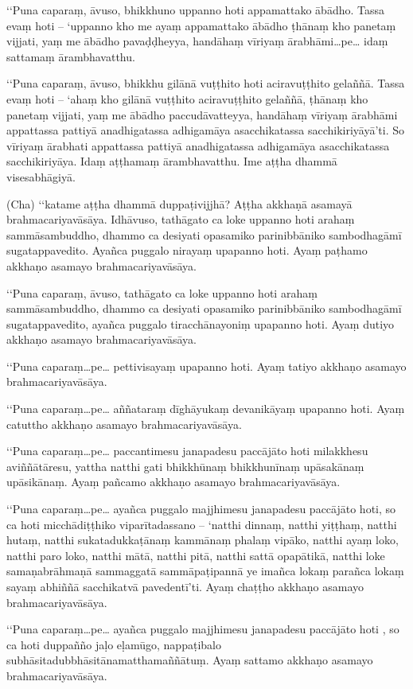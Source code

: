 ‘‘Puna caparaṃ, āvuso, bhikkhuno uppanno hoti appamattako ābādho. Tassa evaṃ hoti – ‘uppanno kho me ayaṃ appamattako ābādho ṭhānaṃ kho panetaṃ vijjati, yaṃ me ābādho pavaḍḍheyya, handāhaṃ vīriyaṃ ārabhāmi…pe… idaṃ sattamaṃ ārambhavatthu.

‘‘Puna caparaṃ, āvuso, bhikkhu gilānā vuṭṭhito hoti aciravuṭṭhito gelaññā. Tassa evaṃ hoti – ‘ahaṃ kho gilānā vuṭṭhito aciravuṭṭhito gelaññā, ṭhānaṃ kho panetaṃ vijjati, yaṃ me ābādho paccudāvatteyya, handāhaṃ vīriyaṃ ārabhāmi appattassa pattiyā anadhigatassa adhigamāya asacchikatassa sacchikiriyāyā’ti. So vīriyaṃ ārabhati appattassa pattiyā anadhigatassa adhigamāya asacchikatassa sacchikiriyāya. Idaṃ aṭṭhamaṃ ārambhavatthu. Ime aṭṭha dhammā visesabhāgiyā.

(Cha) ‘‘katame aṭṭha dhammā duppaṭivijjhā? Aṭṭha akkhaṇā asamayā brahmacariyavāsāya. Idhāvuso, tathāgato ca loke uppanno hoti arahaṃ sammāsambuddho, dhammo ca desiyati opasamiko parinibbāniko sambodhagāmī sugatappavedito. Ayañca puggalo nirayaṃ upapanno hoti. Ayaṃ paṭhamo akkhaṇo asamayo brahmacariyavāsāya.

‘‘Puna caparaṃ, āvuso, tathāgato ca loke uppanno hoti arahaṃ sammāsambuddho, dhammo ca desiyati opasamiko parinibbāniko sambodhagāmī sugatappavedito, ayañca puggalo tiracchānayoniṃ upapanno hoti. Ayaṃ dutiyo akkhaṇo asamayo brahmacariyavāsāya.

‘‘Puna caparaṃ…pe… pettivisayaṃ upapanno hoti. Ayaṃ tatiyo akkhaṇo asamayo brahmacariyavāsāya.

‘‘Puna caparaṃ…pe… aññataraṃ dīghāyukaṃ devanikāyaṃ upapanno hoti. Ayaṃ catuttho akkhaṇo asamayo brahmacariyavāsāya.

‘‘Puna caparaṃ…pe… paccantimesu janapadesu paccājāto hoti milakkhesu aviññātāresu, yattha natthi gati bhikkhūnaṃ bhikkhunīnaṃ upāsakānaṃ upāsikānaṃ. Ayaṃ pañcamo akkhaṇo asamayo brahmacariyavāsāya.

‘‘Puna caparaṃ…pe… ayañca puggalo majjhimesu janapadesu paccājāto hoti, so ca hoti micchādiṭṭhiko viparītadassano – ‘natthi dinnaṃ, natthi yiṭṭhaṃ, natthi hutaṃ, natthi sukatadukkaṭānaṃ kammānaṃ phalaṃ vipāko, natthi ayaṃ loko, natthi paro loko, natthi mātā, natthi pitā, natthi sattā opapātikā, natthi loke samaṇabrāhmaṇā sammaggatā sammāpaṭipannā ye imañca lokaṃ parañca lokaṃ sayaṃ abhiññā sacchikatvā pavedentī’ti. Ayaṃ chaṭṭho akkhaṇo asamayo brahmacariyavāsāya.

‘‘Puna caparaṃ…pe… ayañca puggalo majjhimesu janapadesu paccājāto hoti , so ca hoti duppañño jaḷo eḷamūgo, nappaṭibalo subhāsitadubbhāsitānamatthamaññātuṃ. Ayaṃ sattamo akkhaṇo asamayo brahmacariyavāsāya.

